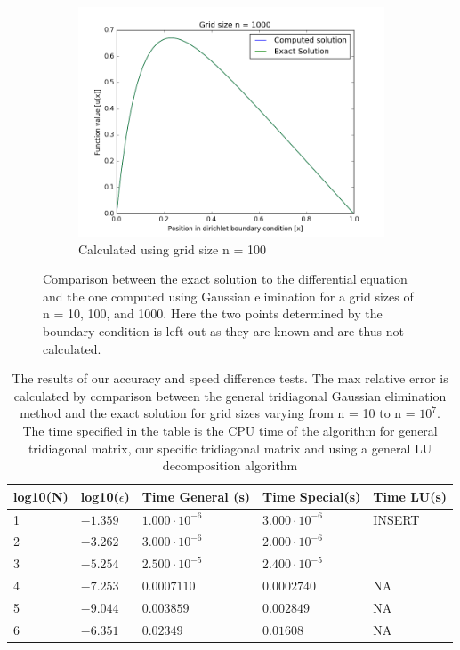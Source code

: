 \documentclass[a4paper,11pt]{article}
\begin{document}
{\begin{figure}[H]
\begin{subfigure}[b]{0.3\textwidth}
		\includegraphics[scale=0.3]{n=1000}
		\caption{Calculated using grid size n = 100}
		\label{fig:n=1000}
	\end{subfigure}
	\caption{Comparison between the exact solution to the differential equation and the one computed using Gaussian elimination for a grid sizes of n = 10, 100, and 1000. Here the two points determined by the boundary condition is left out as they are known and are thus not calculated.}\label{fig:exact_vs_calculated}
\end{figure}




		
\begin{table}[H]
	\centering
	\caption{The results of our accuracy and speed difference tests. The max relative error is calculated by comparison between the general tridiagonal Gaussian elimination method and the exact solution for grid sizes varying from n = 10 to n = $10^{7}$. The time specified in the table is the CPU time of the algorithm for general tridiagonal matrix, our specific tridiagonal matrix and using a general LU decomposition algorithm}
	\label{table:Results}
	\begin{tabular}{|lllll|} \hline
		log10(N) & log10($\epsilon$) & Time General (s)     & Time Special(s)      & Time LU(s) \\
		\hline 
		1        & $-1.359$       &$1.000\cdot 10^{-6}$  &$3.000\cdot 10^{-6}$ & INSERT     \\
		2        & $-3.262$       &$3.000\cdot 10^{-6}$  &$2.000\cdot 10^{-6}$ &            \\
		3        & $-5.254$       &$2.500\cdot 10^{-5}$  &$2.400\cdot 10^{-5}$ &            \\
		4        & $-7.253$       &$0.0007110$ 	         &$0.0002740$		   &   NA       \\
		5        & $-9.044$       &$0.003859$	         &$0.002849$	       &   NA       \\
		6        & $-6.351$       &$0.02349$	         &$0.01608$	           &   NA       \\
		\hline
	\end{tabular}
\end{table}
		
}
\end{document}
